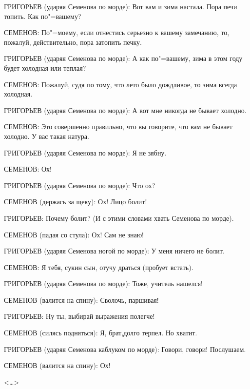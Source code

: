 ГРИГОРЬЕВ (ударяя Семенова по морде): Вот вам и зима настала. Пора печи топить. Как по"=вашему?

СЕМЕНОВ: По"=моему, если отнестись серьезно к вашему замечанию, то, пожалуй, действительно, пора затопить печку.

ГРИГОРЬЕВ (ударяя Семенова по морде): А как по"=вашему, зима в этом году будет холодная или теплая?

СЕМЕНОВ: Пожалуй, судя по тому, что лето было дождливое, то зима всегда холодная.

ГРИГОРЬЕВ (ударяя Семенова по морде): А вот мне никогда не бывает холодно.

СЕМЕНОВ: Это совершенно правильно, что вы говорите, что вам не бывает холодно. У вас такая натура.

ГРИГОРЬЕВ (ударяя Семенова по морде): Я не зябну.

СЕМЕНОВ: Ох!

ГРИГОРЬЕВ (ударяя Семенова по морде): Что ох?

СЕМЕНОВ (держась за щеку): Ох! Лицо болит!

ГРИГОРЬЕВ: Почему болит? (И с этими словами хвать Семенова по морде).

СЕМЕНОВ (падая со стула): Ох! Сам не знаю!

ГРИГОРЬЕВ (ударяя Семенова ногой по морде): У меня ничего не болит.

СЕМЕНОВ: Я тебя, сукин сын, отучу драться (пробует встать).

ГРИГОРЬЕВ (ударяя Семенова по морде): Тоже, учитель нашелся!

СЕМЕНОВ (валится на спину): Сволочь, паршивая!

ГРИГОРЬЕВ: Ну ты, выбирай выражения полегче!

СЕМЕНОВ (силясь подняться): Я, брат,долго терпел. Но хватит.

ГРИГОРЬЕВ (ударяя Семенова каблуком по морде): Говори, говори! Послушаем.

СЕМЕНОВ (валится на спину): Ох!

\begin{flushright}
    <\dots>
\end{flushright}